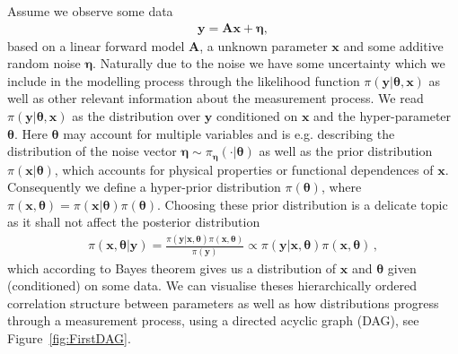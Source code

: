 Assume we observe some data
\begin{align}
	\bm{y} = \bm{A} \bm{x} + \bm{\eta},
	\label{eq:LinDat}
\end{align}
based on a linear forward model $\bm{A}$, a unknown parameter $\bm{x}$ and some additive random noise $\bm{\eta}$.
Naturally due to the noise we have some uncertainty which we include in the modelling process through the likelihood function $\pi(\bm{y}|\bm{\theta},\bm{x})$ as well as other relevant information about the measurement process.
We read $\pi(\bm{y}|\bm{\theta},\bm{x})$ as the distribution over $\bm{y}$ conditioned on $\bm{x}$ and the hyper-parameter $\bm{\theta}$.
Here $\bm{\theta}$ may account for multiple variables and is e.g. describing the distribution of the noise vector $\bm{\eta} \sim \pi_{\bm{\eta}}(\cdot|\bm{\theta})$ as well as the prior distribution $\pi(\bm{x}|\bm{\theta})$, which accounts for physical properties or functional dependences of $\bm{x}$.
Consequently we define a hyper-prior distribution $\pi(\bm{\theta})$, where $\pi(\bm{x}, \bm{\theta}) = \pi(\bm{x}|\bm{\theta}) \pi(\bm{\theta}) $.
Choosing these prior distribution is a delicate topic as it shall not affect the posterior distribution 
 \begin{align}
 	\pi(\bm{x},\bm{\theta}|\bm{y}) = \frac{ \pi(\bm{y} | \bm{x}, \bm{\theta} ) \pi(\bm{x}, \bm{\theta})}{\pi(\bm{y})} \propto \pi(\bm{y} | \bm{x}, \bm{\theta} ) \pi(\bm{x}, \bm{\theta}) \, ,
 \end{align}
which according to Bayes theorem gives us a distribution of $\bm{x}$ and $\bm{\theta}$ given (conditioned) on some data.
We can visualise theses hierarchically ordered correlation structure between parameters as well as how distributions progress through a measurement process, using a directed acyclic graph (DAG), see Figure~\ref{fig:FirstDAG}.

